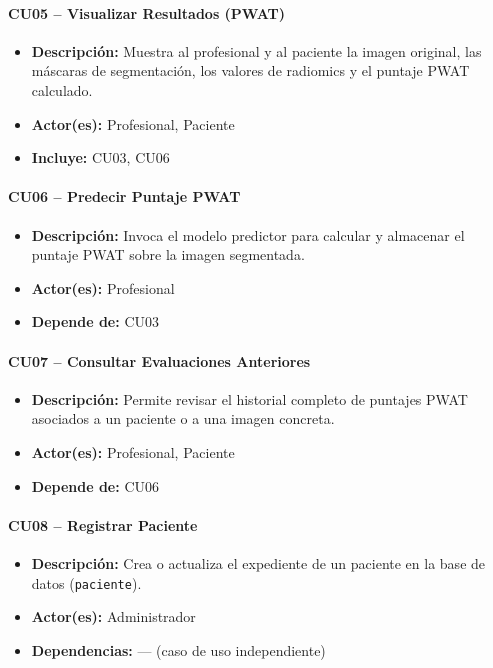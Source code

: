 \paragraph{CU05 -- Visualizar Resultados (PWAT)}
\begin{itemize}
  \item \textbf{Descripción:} Muestra al profesional y al paciente la imagen original, las máscaras de segmentación, los valores de radiomics y el puntaje PWAT calculado.
  \item \textbf{Actor(es):} Profesional, Paciente
  \item \textbf{Incluye:} CU03, CU06
\end{itemize}

\paragraph{CU06 -- Predecir Puntaje PWAT}
\begin{itemize}
  \item \textbf{Descripción:} Invoca el modelo predictor para calcular y almacenar el puntaje PWAT sobre la imagen segmentada.
  \item \textbf{Actor(es):} Profesional
  \item \textbf{Depende de:} CU03
\end{itemize}

\paragraph{CU07 -- Consultar Evaluaciones Anteriores}
\begin{itemize}
  \item \textbf{Descripción:} Permite revisar el historial completo de puntajes PWAT asociados a un paciente o a una imagen concreta.
  \item \textbf{Actor(es):} Profesional, Paciente
  \item \textbf{Depende de:} CU06
\end{itemize}

\paragraph{CU08 -- Registrar Paciente}
\begin{itemize}
  \item \textbf{Descripción:} Crea o actualiza el expediente de un paciente en la base de datos (\texttt{paciente}).
  \item \textbf{Actor(es):} Administrador
  \item \textbf{Dependencias:} — (caso de uso independiente)
\end{itemize}

